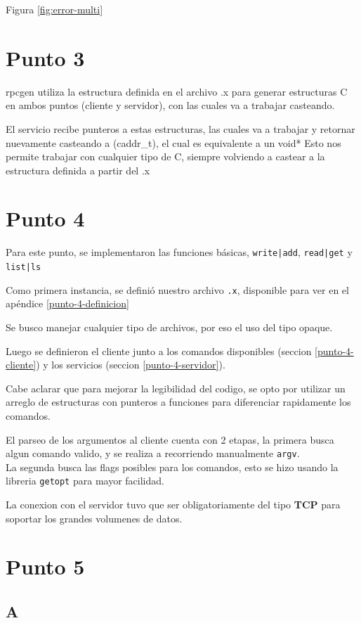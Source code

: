 \documentclass[12pt,journal,compsoc]{IEEEtran}
\begin{document}
Figura \ref{fig:error-multi}

\section{Punto 3}
rpcgen utiliza la estructura definida en el archivo .x para generar estructuras C en ambos puntos (cliente y servidor), con las cuales va a trabajar casteando.

El servicio recibe punteros a estas estructuras, las cuales va a trabajar y retornar nuevamente casteando a (caddr\_t), el cual es equivalente a un void*
Esto nos permite trabajar con cualquier tipo de C, siempre volviendo a castear a la estructura definida a partir del .x

\section{Punto 4}

Para este punto, se implementaron las funciones básicas, \texttt{write|add}, \texttt{read|get} y \texttt{list|ls}

Como primera instancia, se definió nuestro archivo \texttt{.x}, disponible para ver en el apéndice \ref{punto-4-definicion}

Se busco manejar cualquier tipo de archivos, por eso el uso del tipo opaque.

Luego se definieron el cliente junto a los comandos disponibles (seccion \ref{punto-4-cliente}) y los servicios (seccion \ref{punto-4-servidor}).

Cabe aclarar que para mejorar la legibilidad del codigo, se opto por utilizar un arreglo de estructuras con punteros a funciones para diferenciar rapidamente los comandos.

El parseo de los argumentos al cliente cuenta con 2 etapas, la primera busca algun comando valido, y se realiza a recorriendo manualmente \texttt{argv}.\\
La segunda busca las flags posibles para los comandos, esto se hizo usando la libreria \texttt{getopt} para mayor facilidad.

La conexion con el servidor tuvo que ser obligatoriamente del tipo \textbf{TCP} para soportar los grandes volumenes de datos.

\section{Punto 5}
\subsection{A}
\end{document}
